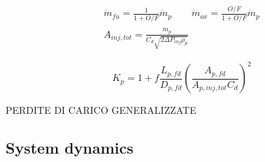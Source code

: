 \begin{gather}
    \dot{m}_{fu} = \frac{1}{1 + O/F}\dot{m}_p \qquad \dot{m}_{ox} = \frac{O/F}{1 + O/F}\dot{m}_p
    \\
    A_{inj,tot} = \frac{\dot{m}_p}{C_d \sqrt{2\Delta P_{inj} \rho_p}} 
\end{gather}
   
\begin{equation}
    K_{p} = 1 + f \frac{L_{p,fd}}{D_{p,fd}} \left(\frac{A_{p, fd}}{A_{p,inj, tot}C_d}\right)^2
\end{equation}

PERDITE DI CARICO GENERALIZZATE
 
\subsection{System dynamics}
\label{subsec:dynamics}

